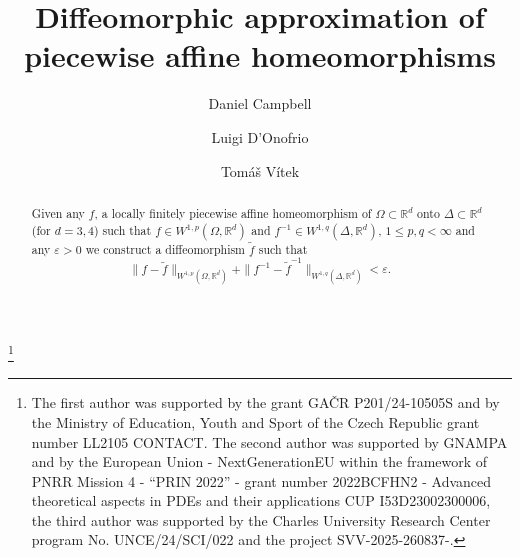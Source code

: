\documentclass[12pt,a4paper]{amsart}
\theoremstyle{plain}
\theoremstyle{definition}
\numberwithin{equation}{section}
\def\epsilon{\varepsilon}
\begin{document}
	
	\title[Approximation of p-w affine homeomorphisms]{Diffeomorphic approximation of piecewise affine homeomorphisms}
	
	\author[D. Campbell]{Daniel Campbell}
	\address{Department of Mathematical Analysis, Charles University, So\-ko\-lovsk\'a 83, 186~00 Prague 8, Czech Republic}
	
	\author[L. D'Onofrio]{Luigi D'Onofrio}
	\address{Dipartimento di Scienze e Tecnologie Universita' di Napoli Parthenope, ISOLA C4, 80100 Napoli, Italy}
	
	\author[T. Vítek]{Tomáš Vítek}
	\address{Mathematical Institute, Faculty of Mathematics and Physics, Charles University, So\-ko\-lovsk\'a 83, 186~00 Prague 8, Czech Republic}
	
	
	
	\thanks{The first author was supported by the grant GA\v{C}R P201/24-10505S and by the Ministry of Education, Youth and Sport of
		the Czech Republic grant number LL2105 CONTACT. The second author was supported by GNAMPA and by the European Union - NextGenerationEU within the framework of PNRR  Mission 4 - ``PRIN 2022'' - grant number 2022BCFHN2 - Advanced theoretical aspects in PDEs and their applications CUP I53D23002300006, the third author was supported by the Charles University Research Center program No. UNCE/24/SCI/022 and the project SVV-2025-260837-.}
	
	
	
	
	
	\begin{abstract}
		Given any $f$, a locally finitely piecewise affine homeomorphism of $\Omega \subset \mathbb{R}^d$ onto $\Delta \subset \mathbb{R}^d$ (for $d=3, 4$) such that $f\in W^{1,p}(\Omega, \mathbb{R}^d)$ and $f^{-1}\in W^{1,q}(\Delta, \mathbb{R}^d)$, $1\leq p ,q < \infty$ and any $\epsilon >0$ we construct a diffeomorphism $\tilde{f}$ such that 
		$$\|f-\tilde{f}\|_{W^{1,p}(\Omega,\mathbb{R}^d)} + \|f^{-1}-\tilde{f}^{-1}\|_{W^{1,q}(\Delta,\mathbb{R}^d)} < \epsilon.$$
	\end{abstract}
	
	\maketitle
	
\end{document}
